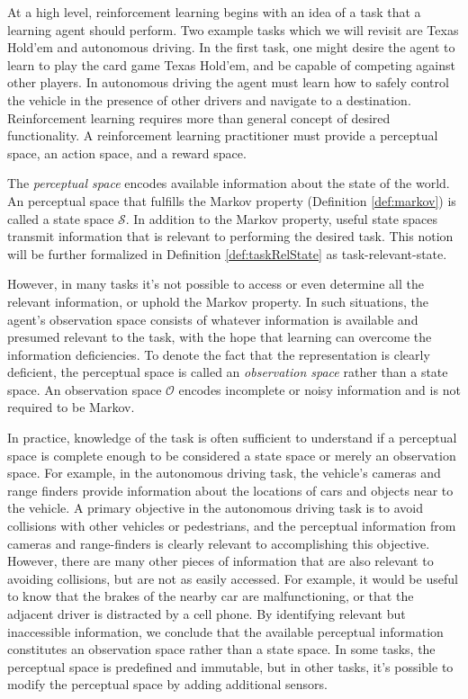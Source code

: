 \documentclass{article} %
\theoremstyle{definition}
\begin{document}
At a high level, reinforcement learning begins with an idea of a task
that a learning agent should perform. Two example tasks which we will
revisit are Texas Hold'em and autonomous driving. In the first task,
one might desire the agent to learn to play the card game Texas
Hold'em, and be capable of competing against other players. In
autonomous driving the agent must learn how to safely control the
vehicle in the presence of other drivers and navigate to a
destination. Reinforcement learning requires more than general concept
of desired functionality. A reinforcement learning practitioner must
provide a perceptual space, an action space, and a reward space.

The \textit{perceptual space} encodes available information about the
state of the world. An perceptual space that fulfills the Markov
property (Definition \ref{def:markov}) is called a state space
$\mathcal{S}$. In addition to the Markov property, useful state spaces
transmit information that is relevant to performing the desired
task. This notion will be further formalized in Definition
\ref{def:taskRelState} as task-relevant-state.

However, in many tasks it's not possible to access or even determine
all the relevant information, or uphold the Markov property. In such
situations, the agent's observation space consists of whatever
information is available and presumed relevant to the task, with the
hope that learning can overcome the information deficiencies. To
denote the fact that the representation is clearly deficient, the
perceptual space is called an \textit{observation space} rather than a
state space. An observation space $\mathcal{O}$ encodes incomplete or
noisy information and is not required to be Markov.

In practice, knowledge of the task is often sufficient to understand
if a perceptual space is complete enough to be considered a state
space or merely an observation space. For example, in the autonomous
driving task, the vehicle's cameras and range finders provide
information about the locations of cars and objects near to the
vehicle. A primary objective in the autonomous driving task is to
avoid collisions with other vehicles or pedestrians, and the
perceptual information from cameras and range-finders is clearly
relevant to accomplishing this objective. However, there are many
other pieces of information that are also relevant to avoiding
collisions, but are not as easily accessed. For example, it would be
useful to know that the brakes of the nearby car are malfunctioning,
or that the adjacent driver is distracted by a cell phone. By
identifying relevant but inaccessible information, we conclude that
the available perceptual information constitutes an observation space
rather than a state space. In some tasks, the perceptual space is
predefined and immutable, but in other tasks, it's possible to modify
the perceptual space by adding additional sensors.
\end{document}
